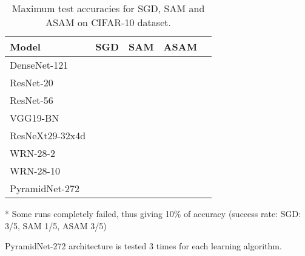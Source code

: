 \documentclass{article}
\begin{document}
\begin{table}[t]
\ificml
\else
    \centering
\fi
\begin{threeparttable}
\caption{Maximum test accuracies for SGD, SAM and ASAM on CIFAR-10 dataset. \label{table1}}
\begin{center}
\begin{small}
\begin{tabular}{lcccr}
\toprule
Model & SGD & SAM & ASAM \\
\midrule
DenseNet-121 &  &  &  \\
ResNet-20 &  &  &  \\
ResNet-56 &  &  &  \\
VGG19-BN &  &  &  \\
{\fontsize{8}{9.6}\selectfont ResNeXt29-32x4d} &  &  &  \\
WRN-28-2 &  &  &  \\
WRN-28-10 &  &  &  \\
\midrule
{\fontsize{8.5}{9.6}\selectfont PyramidNet-272} &  &  &  \\
\bottomrule
\end{tabular}
\begin{tablenotes}
\item[*] Some runs completely failed, thus giving 10\% of accuracy (success rate: SGD: 3/5, SAM 1/5, ASAM 3/5)
\item[] PyramidNet-272 architecture is tested 3 times for each learning algorithm.
\end{tablenotes}
\end{small}
\end{center}
\end{threeparttable}
\end{table}
\end{document}
